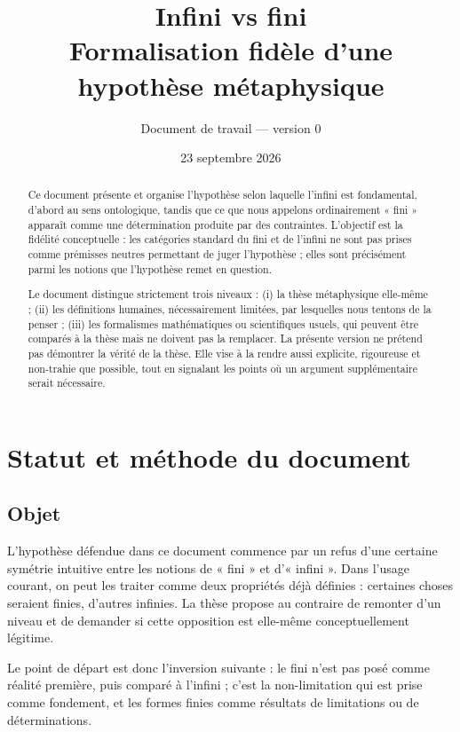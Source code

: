 \documentclass[11pt,a4paper]{article}
\title{\textbf{Infini vs fini}\\
\large Formalisation fidèle d'une hypothèse métaphysique}
\author{Document de travail --- version 0}
\date{23 septembre 2026}
\begin{document}
\maketitle

\begin{abstract}
Ce document présente et organise l'hypothèse selon laquelle l'infini est fondamental, d'abord au sens ontologique, tandis que ce que nous appelons ordinairement « fini » apparaît comme une détermination produite par des contraintes. L'objectif est la fidélité conceptuelle : les catégories standard du fini et de l'infini ne sont pas prises comme prémisses neutres permettant de juger l'hypothèse ; elles sont précisément parmi les notions que l'hypothèse remet en question.

Le document distingue strictement trois niveaux : (i) la thèse métaphysique elle-même ; (ii) les définitions humaines, nécessairement limitées, par lesquelles nous tentons de la penser ; (iii) les formalismes mathématiques ou scientifiques usuels, qui peuvent être comparés à la thèse mais ne doivent pas la remplacer. La présente version ne prétend pas démontrer la vérité de la thèse. Elle vise à la rendre aussi explicite, rigoureuse et non-trahie que possible, tout en signalant les points où un argument supplémentaire serait nécessaire.
\end{abstract}

\tableofcontents

\section{Statut et méthode du document}

\subsection{Objet}

L'hypothèse défendue dans ce document commence par un refus d'une certaine symétrie intuitive entre les notions de « fini » et d'« infini ». Dans l'usage courant, on peut les traiter comme deux propriétés déjà définies : certaines choses seraient finies, d'autres infinies. La thèse propose au contraire de remonter d'un niveau et de demander si cette opposition est elle-même conceptuellement légitime.

Le point de départ est donc l'inversion suivante : le fini n'est pas posé comme réalité première, puis comparé à l'infini ; c'est la non-limitation qui est prise comme fondement, et les formes finies comme résultats de limitations ou de déterminations.
\end{document}
